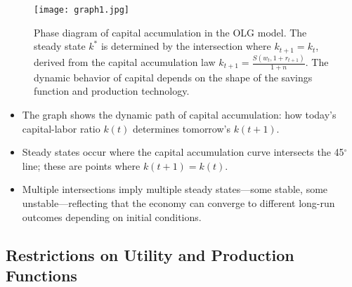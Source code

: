 \documentclass[12pt]{article}
\begin{document}
\begin{figure}[H]
    \centering
    \texttt{[image: graph1.jpg]}
    \caption{Phase diagram of capital accumulation in the OLG model. The steady state $k^*$ is determined by the intersection where $k_{t+1} = k_t$, derived from the capital accumulation law $k_{t+1} = \frac{S(w_t, 1 + r_{t+1})}{1 + n}$. The dynamic behavior of capital depends on the shape of the savings function and production technology.}
    \label{fig:olg_phase_diagram}
\end{figure}

\begin{itemize}
    \item The graph shows the dynamic path of capital accumulation: how today's capital-labor ratio \(k(t)\) determines tomorrow's \(k(t+1)\).
    \item Steady states occur where the capital accumulation curve intersects the 45$^\circ$ line; these are points where \(k(t+1) = k(t)\).
    \item Multiple intersections imply multiple steady states—some stable, some unstable—reflecting that the economy can converge to different long-run outcomes depending on initial conditions.
\end{itemize}

\subsection*{\noindent\textbf{Restrictions on Utility and Production Functions}}
\end{document}
